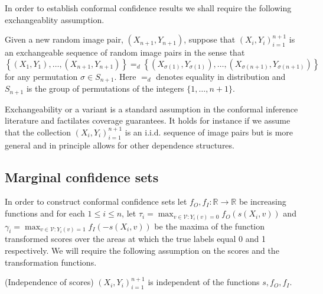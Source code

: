 In order to establish conformal confidence results we shall require the following exchangeablity assumption. 
\begin{assumption}\label{ass:ex}
		Given a new random image pair, $(X_{n+1},Y_{n+1})$, suppose that $(X_i, Y_i)_{i = 1}^{n+1}$ is an exchangeable sequence of random image pairs in the sense that 
	\begin{equation*}
		\left\lbrace (X_1,Y_1), \dots, (X_{n+1}, Y_{n+1}) \right\rbrace =_d \left\lbrace (X_{\sigma(1)}, Y_{\sigma(1)}), \dots, (X_{\sigma(n+1)}, Y_{\sigma(n+1)}) \right\rbrace
	\end{equation*}
	for any permutation $\sigma \in S_{n+1}$. Here $=_d$ denotes equality in distribution and $S_{n+1} $ is the group of permutations of the integers $\lbrace1, \dots, n+1\rbrace$.
\end{assumption}
Exchangeability or a variant is a standard assumption in the conformal inference literature \citep{Angelopoulos2021} and factilates coverage guarantees. It holds for instance if we assume that the collection $(X_i, Y_i)_{i = 1}^{n+1}$ is an i.i.d. sequence of image pairs but is more general and in principle allows for other dependence structures. 

\subsection{Marginal confidence sets}\label{SS:MCS}
In order to construct conformal confidence sets let $f_O, f_I:\mathbb{R} \rightarrow \mathbb{R}$ be increasing functions and for each $1\leq i \leq n$, let $\tau_i = \max_{v \in \mathcal{V}: Y_i(v) = 0} f_O(s(X_i,v))$ and $\gamma_i = \max_{v \in \mathcal{V}: Y_i(v) = 1} f_I(-s(X_i,v))$  be the maxima of the function transformed scores over the areas at which the true labels equal 0 and 1 respectively. We will require the following assumption on the scores and the transformation functions.
\begin{assumption}\label{ass:indep}
	(Independence of scores) $(X_i, Y_i)_{i = 1}^{n+1}$ is independent of the functions $s, f_O, f_I$. 
\end{assumption}


